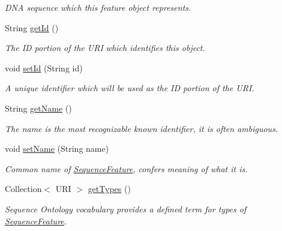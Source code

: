 \begin{DoxyCompactItemize}
\begin{DoxyCompactList}\small\item\em DNA sequence which this feature object represents. \item\end{DoxyCompactList}\item 
String \hyperlink{classorg_1_1sbolstandard_1_1lib_s_b_o_lj_1_1_sequence_feature_aab219518f0eaf3db55b6a62ad6b49407}{getId} ()
\begin{DoxyCompactList}\small\item\em The ID portion of the URI which identifies this object. \item\end{DoxyCompactList}\item 
void \hyperlink{classorg_1_1sbolstandard_1_1lib_s_b_o_lj_1_1_sequence_feature_a0baf110c74c46a69b4c7a93bb68001b4}{setId} (String id)
\begin{DoxyCompactList}\small\item\em A unique identifier which will be used as the ID portion of the URI. \item\end{DoxyCompactList}\item 
String \hyperlink{classorg_1_1sbolstandard_1_1lib_s_b_o_lj_1_1_sequence_feature_a78ee178b6a73658d65ca60da4d1e6683}{getName} ()
\begin{DoxyCompactList}\small\item\em The name is the most recognizable known identifier, it is often ambiguous. \item\end{DoxyCompactList}\item 
void \hyperlink{classorg_1_1sbolstandard_1_1lib_s_b_o_lj_1_1_sequence_feature_ad737b36b74be994e0d8420797ed72f78}{setName} (String name)
\begin{DoxyCompactList}\small\item\em Common name of \hyperlink{classorg_1_1sbolstandard_1_1lib_s_b_o_lj_1_1_sequence_feature}{SequenceFeature}, confers meaning of what it is. \item\end{DoxyCompactList}\item 
Collection$<$ URI $>$ \hyperlink{classorg_1_1sbolstandard_1_1lib_s_b_o_lj_1_1_sequence_feature_a518b97368db3de477d5fb57150d8b711}{getTypes} ()
\begin{DoxyCompactList}\small\item\em Sequence Ontology vocabulary provides a defined term for types of \hyperlink{classorg_1_1sbolstandard_1_1lib_s_b_o_lj_1_1_sequence_feature}{SequenceFeature}. \item\end{DoxyCompactList}\item 

\end{DoxyCompactItemize}
